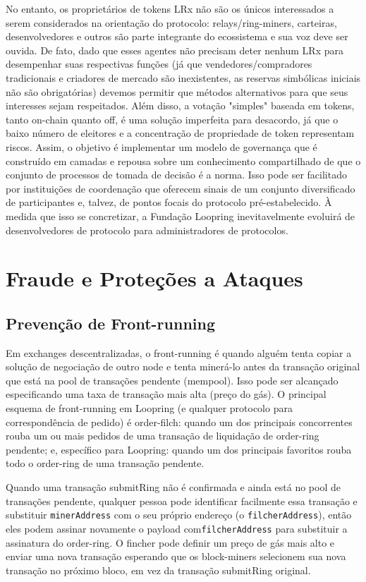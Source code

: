 \documentclass[UTF8,nofonts]{article}
\begin{document}
\begin{multicols}{2}
No entanto, os proprietários de tokens LRx não são os únicos interessados ​​a serem considerados na orientação do protocolo: relays/ring-miners, carteiras, desenvolvedores e outros são parte integrante do ecossistema e sua voz deve ser ouvida. De fato, dado que esses agentes não precisam deter nenhum LRx para desempenhar suas respectivas funções (já que vendedores/compradores tradicionais e criadores de mercado são inexistentes, as reservas simbólicas iniciais não são obrigatórias) devemos permitir que métodos alternativos para que seus interesses sejam respeitados. Além disso, a votação "simples" baseada em tokens, tanto on-chain quanto off, é uma solução imperfeita para desacordo, já que o baixo número de eleitores e a concentração de propriedade de token representam riscos. Assim, o objetivo é implementar um modelo de governança que é construído em camadas e repousa sobre um conhecimento compartilhado de que o conjunto de processos de tomada de decisão é a norma. Isso pode ser facilitado por instituições de coordenação que oferecem sinais de um conjunto diversificado de participantes e, talvez, de pontos focais do protocolo pré-estabelecido. À medida que isso se concretizar, a Fundação Loopring inevitavelmente evoluirá de desenvolvedores de protocolo para administradores de protocolos.

\section{Fraude e Proteções a Ataques}

\subsection{Prevenção de Front-running\label{sec:dual_authoring}}

Em exchanges descentralizadas, o front-running é quando alguém tenta copiar a solução de negociação de outro node e tenta minerá-lo antes da transação original que está na pool de transações pendente (mempool). Isso pode ser alcançado especificando uma taxa de transação mais alta (preço do gás). O principal esquema de front-running em Loopring (e qualquer protocolo para correspondência de pedido) é order-filch: quando um dos principais concorrentes rouba um ou mais pedidos de uma transação de liquidação de order-ring pendente; e, específico para Loopring: quando um dos principais favoritos rouba todo o order-ring de uma transação pendente.


Quando uma transação submitRing não é confirmada e ainda está no pool de transações pendente, qualquer pessoa pode identificar facilmente essa transação e substituir \verb|minerAddress| com o seu próprio endereço (o \verb|filcherAddress|), então eles podem assinar novamente o payload com\verb|filcherAddress| para substituir a assinatura do order-ring. O fincher pode definir um preço de gás mais alto e enviar uma nova transação esperando que os block-miners selecionem sua nova transação no próximo bloco, em vez da transação submitRing original.


\end{multicols}
\end{document}
